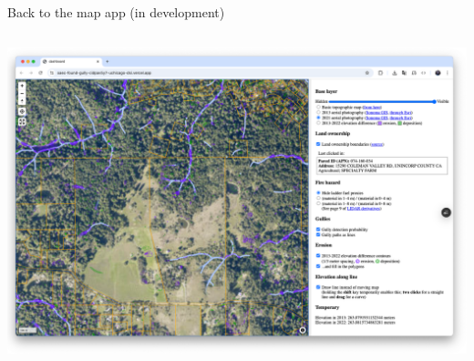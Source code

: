 \documentclass[aspectratio=169]{beamer}
\begin{document}
\begin{frame}{Back to the map app (in development)}
\vspace{0.15 cm}
\begin{columns}
\includegraphics[width=\linewidth]{img/website-again.png}
\end{columns}
\end{frame}
\end{document}
